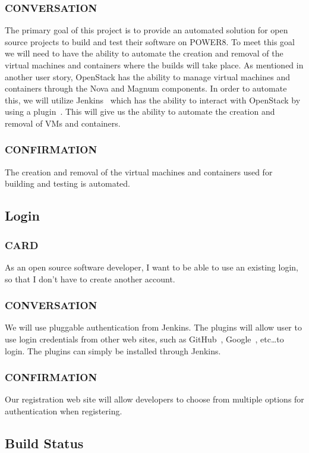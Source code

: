 \documentclass[10pt,letterpaper,onecolumn,journal]{IEEEtran}
\begin{document}
\subsubsection{CONVERSATION}
The primary goal of this project is to provide an automated solution for open source projects to build and test their software on POWER8.
To meet this goal we will need to have the ability to automate the creation and removal of the virtual machines and containers where the builds will take place.
As mentioned in another user story, OpenStack has the ability to manage virtual machines and containers through the Nova and Magnum components.
In order to automate this, we will utilize Jenkins~\cite{jenkinsmain} which has the ability to interact with OpenStack by using a plugin~\cite{jcloudsplugin}.
This will give us the ability to automate the creation and removal of VMs and containers.
\subsubsection{CONFIRMATION}
The creation and removal of the virtual machines and containers used for building and testing is automated.

\subsection{Login}
\subsubsection{CARD}
As an open source software developer, I want to be able to use an existing login, so that I don't have to create another account.
\subsubsection{CONVERSATION}
We will use pluggable authentication from Jenkins. The plugins will allow user to use login credentials from other web sites, such as GitHub~\cite{githublogin}, Google~\cite{googlelogin}, etc\ldots to login. The plugins can simply be installed through Jenkins.
\subsubsection{CONFIRMATION}
Our registration web site will allow developers to choose from multiple options for authentication when registering.

\subsection{Build Status}
\end{document}
